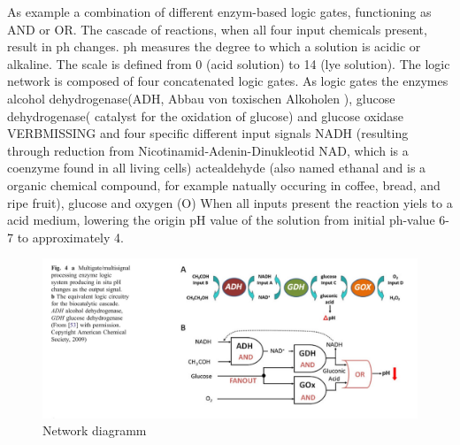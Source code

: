 \documentclass[runningheads]{llncs}
\begin{document}
		As example a combination of different enzym-based logic gates, functioning as AND or OR. The cascade of reactions, when all four input chemicals present, result in ph changes. ph measures the degree to which a solution is acidic or alkaline. The scale is defined from 0 (acid solution) to 14 (lye solution).
		The logic network is composed of four concatenated logic gates. As logic gates the enzymes alcohol dehydrogenase(ADH, Abbau von toxischen Alkoholen ), glucose dehydrogenase( catalyst for the oxidation of glucose) and glucose oxidase VERBMISSING and four specific different input signals NADH (resulting through reduction from Nicotinamid-Adenin-Dinukleotid NAD, which is a coenzyme found in all living cells)  actealdehyde (also named ethanal and is a organic chemical compound, for example natually occuring in coffee, bread, and ripe fruit), glucose  and oxygen (O)
	 	When all inputs present the reaction yiels to a acid medium, lowering the origin pH value of the solution from initial ph-value 6-7 to approximately 4.
		\begin{figure}[H] \centering \includegraphics[scale= 0.3]{pics/biocomputing_sensor.png} \caption{Network diagramm} \label{img:grafik-test} \end{figure}
	
	
\end{document}
